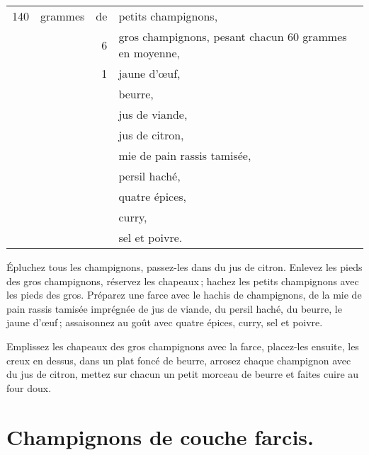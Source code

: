 \footnotesize
\begin{longtable}{rrrp{16em}}
    140 & grammes & de & petits champignons,                                                              \\
        &         &  6 & gros champignons, pesant chacun 60 grammes en moyenne,                           \\
        &         &  1 & jaune d'œuf,                                                                     \\
        &         &    & beurre,                                                                          \\
        &         &    & jus de viande,                                                                   \\
        &         &    & jus de citron,                                                                   \\
        &         &    & mie de pain rassis tamisée,                                                      \\
        &         &    & persil haché,                                                                    \\
        &         &    & quatre épices,                                                                   \\
        &         &    & curry,                                                                           \\
        &         &    & sel et poivre.                                                                   \\
\end{longtable}
\normalsize

Épluchez tous les champignons, passez-les dans du jus de citron. Enlevez les
pieds des gros champignons, réservez les chapeaux ; hachez les petits
champignons avec les pieds des gros. Préparez une farce avec le hachis de
champignons, de la mie de pain rassis tamisée imprégnée de jus de viande, du
persil haché, du beurre, le jaune d'œuf ; assaisonnez au goût avec quatre
épices, curry, sel et poivre.

Emplissez les chapeaux des gros champignons avec la farce, placez-les ensuite,
les creux en dessus, dans un plat foncé de beurre, arrosez chaque champignon
avec du jus de citron, mettez sur chacun un petit morceau de beurre et faites
cuire au four doux.

\section*{\centering Champignons de couche farcis.}
{}

